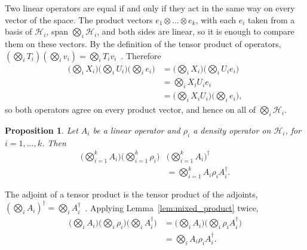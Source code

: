 \documentclass{ieeeaccess}
\newtheorem{proposition}{Proposition}[section]
\begin{document}
\begin{IEEEproof}
  Two linear operators are equal if and only if they act in the same way on every vector of the space. The product vectors $e_1 \otimes \dots \otimes e_k$, with each $e_i$ taken from a basis of $\mathcal{H}_i$, span $\bigotimes_{i} \mathcal{H}_i$, and both sides are linear, so it is enough to compare them on these vectors. By the definition of the tensor product of operators, $(\bigotimes_i T_i)(\bigotimes_i v_i) = \bigotimes_i T_i v_i$~\cite[Eq.~(1.8)]{zwiebach2013tensor}.
  Therefore
  \begin{align*}
    \Big(\bigotimes_{i} X_i\Big)\Big(\bigotimes_{i} U_i\Big)\Big(\bigotimes_{i} e_i\Big)
    &= \Big(\bigotimes_{i} X_i\Big)\Big(\bigotimes_{i} U_i e_i\Big) \\
    &= \bigotimes_{i} X_i U_i e_i \\
    &= \Big(\bigotimes_{i} X_i U_i\Big)\Big(\bigotimes_{i} e_i\Big),
  \end{align*}
  so both operators agree on every product vector, and hence on all of $\bigotimes_i \mathcal{H}_i$.
\end{IEEEproof}

\begin{proposition}
  Let $A_i$ be a linear operator and $\rho_i$ a density operator on $\mathcal{H}_i$, for $i = 1, \dots, k$. Then
  \begin{align*}
    \Big(\bigotimes_{i=1}^{k} A_i\Big)\Big(\bigotimes_{i=1}^{k} \rho_i\Big)&\Big(\bigotimes_{i=1}^{k} A_i\Big)^{\dagger} \\
    &= \bigotimes_{i=1}^{k} A_i \rho_i A_i^{\dagger}.
  \end{align*}
  \label{prop:product_operation}
\end{proposition}

\begin{IEEEproof}
  The adjoint of a tensor product is the tensor product of the adjoints, $(\bigotimes_i A_i)^{\dagger} = \bigotimes_i A_i^{\dagger}$~\cite[Sec.~1.1.2, Eq.~(1.75)]{watrous2018theory}.
  Applying Lemma~\ref{lem:mixed_product} twice,
  \begin{align*}
    \Big(\bigotimes_{i} A_i\Big)\Big(\bigotimes_{i} \rho_i\Big)\Big(\bigotimes_{i} A_i^{\dagger}\Big)
    &= \Big(\bigotimes_{i} A_i\Big)\Big(\bigotimes_{i} \rho_i A_i^{\dagger}\Big) \\
    &= \bigotimes_{i} A_i \rho_i A_i^{\dagger}.
  \end{align*}
\end{IEEEproof}
\end{document}
